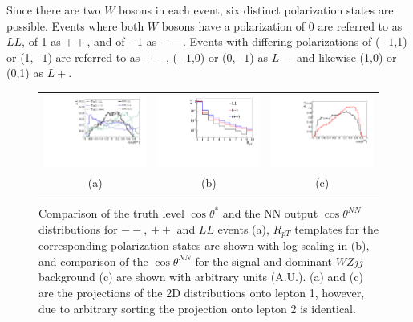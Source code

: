 \documentclass[aps,prl,twocolumn,showpacs,superscriptaddress,groupeaddress,floatfix]{revtex4}
\def\ts{\ensuremath{ \theta^{*} }\xspace}
\def\tsNN{\ensuremath{ \theta^{NN} }\xspace}
\def\cts{\ensuremath{ \cos\ts }\xspace}
\def\ctsNN{\ensuremath{ \cos\tsNN }\xspace}
\begin{document}
Since there are two $W$ bosons in each event, six distinct polarization states are possible. Events where both $W$ bosons have a polarization of 0 are referred to as $LL$, of 1 as $++$, and of $-1$ as $--$. Events with differing polarizations of ($-1$,1) or (1,$-1$) are referred to as $+-$, ($-1$,0) or (0,$-1$) as $L-$ and likewise (1,0) or (0,1) as $L+$. 

\begin{figure}
\begin{tabular}{ccc}
\includegraphics[width=.32\textwidth,height=.18\textheight]{fig_01a.pdf}&
\includegraphics[width=.32\textwidth,height=.18\textheight]{fig_01b.pdf}&
\includegraphics[width=.32\textwidth,height=.19\textheight]{fig_01c.pdf}\\
(a)&(b)&(c)\\
\end{tabular}
\caption{\label{fig:polarization_comparison} Comparison of the truth level \cts and the 
NN output \ctsNN distributions for $--$, $++$ and $LL$ events (a), 
$R_{pT}$ templates for the corresponding polarization states are shown with log scaling in (b), 
and comparison of the \ctsNN for the signal and dominant $WZjj$ background (c) are shown with arbitrary units (A.U.). (a) and (c) are the 
projections of the 2D distributions onto lepton 1, however, due to arbitrary sorting the projection onto lepton 2 is identical.}
\end{figure}
\end{document}
